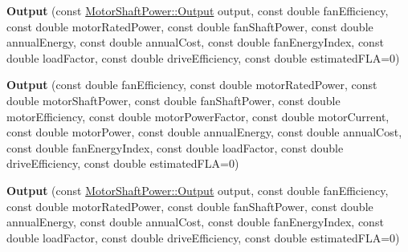\begin{DoxyCompactItemize}
{\bfseries Output} (const \hyperlink{struct_motor_shaft_power_1_1_output}{Motor\+Shaft\+Power\+::\+Output} output, const double fan\+Efficiency, const double motor\+Rated\+Power, const double fan\+Shaft\+Power, const double annual\+Energy, const double annual\+Cost, const double fan\+Energy\+Index, const double load\+Factor, const double drive\+Efficiency, const double estimated\+F\+LA=0)
\item 
\mbox{\label{struct_fan_result_1_1_output_a557a94bc157a5e71cd8e57b5bdf6c1e7}} 
{\bfseries Output} (const double fan\+Efficiency, const double motor\+Rated\+Power, const double motor\+Shaft\+Power, const double fan\+Shaft\+Power, const double motor\+Efficiency, const double motor\+Power\+Factor, const double motor\+Current, const double motor\+Power, const double annual\+Energy, const double annual\+Cost, const double fan\+Energy\+Index, const double load\+Factor, const double drive\+Efficiency, const double estimated\+F\+LA=0)
\item 
\mbox{\label{struct_fan_result_1_1_output_a1f99eb8da726ccb297ae40d77b461de0}} 
{\bfseries Output} (const \hyperlink{struct_motor_shaft_power_1_1_output}{Motor\+Shaft\+Power\+::\+Output} output, const double fan\+Efficiency, const double motor\+Rated\+Power, const double fan\+Shaft\+Power, const double annual\+Energy, const double annual\+Cost, const double fan\+Energy\+Index, const double load\+Factor, const double drive\+Efficiency, const double estimated\+F\+LA=0)
\end{DoxyCompactItemize}

